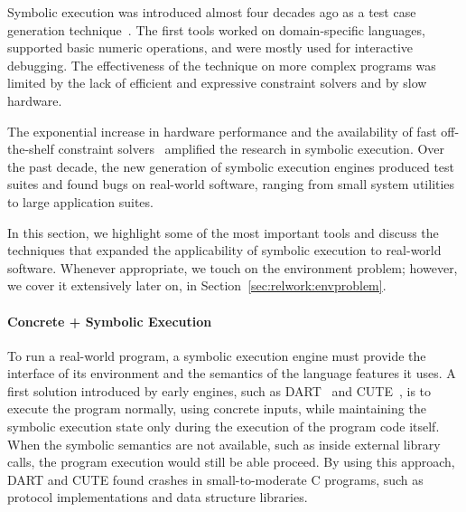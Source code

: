 
Symbolic execution was introduced almost four decades ago as a test case generation technique~\cite{king:symbolic:2, boyer:symbolic}.  The first tools worked on domain-specific languages, supported basic numeric operations, and were mostly used for interactive debugging.  The effectiveness of the technique on more complex programs was limited by the lack of efficient and expressive constraint solvers and by slow hardware.


The exponential increase in hardware performance and the availability of fast off-the-shelf constraint solvers~\cite{chaff,minisat,stp,Z3,cvc} amplified the research in symbolic execution.  Over the past decade, the new generation of symbolic execution engines produced test suites and found bugs on real-world software, ranging from small system utilities to large application suites.

In this section, we highlight some of the most important tools and discuss the techniques that expanded the applicability of symbolic execution to real-world software.  Whenever appropriate, we touch on the environment problem; however, we cover it extensively later on, in Section~\ref{sec:relwork:envproblem}.

\paragraph{Concrete + Symbolic Execution}

To run a real-world program, a symbolic execution engine must provide the interface of its environment and the semantics of the language features it uses.
%
A first solution introduced by early engines, such as DART~\cite{dart} and CUTE~\cite{cute}, is to execute the program normally, using concrete inputs, while maintaining the symbolic execution state only during the execution of the program code itself.
%
When the symbolic semantics are not available, such as inside external library calls, the program execution would still be able proceed.
%
By using this approach, DART and CUTE found crashes in small-to-moderate C programs, such as protocol implementations and data structure libraries.

